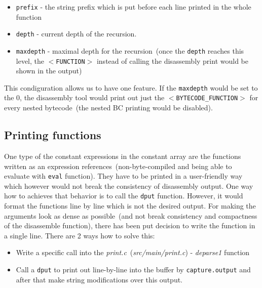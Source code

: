 \documentclass[thesis=M,english]{FITthesis}[2018/10/20]
\newcommand{\code}[1]{\texttt{#1}}
\begin{document}
\begin{itemize}
	\item \code{prefix} - the string prefix which is put before each line printed in the whole function

	\item \code{depth} - current depth of the recursion.

	\item \code{maxdepth} - maximal depth for the recursion~(once the \code{depth} reaches this level, the \code{$<$FUNCTION$>$} instead of calling the disassembly print would be shown in the output)
\end{itemize}

This condiguration allows us to have one feature. If the \code{maxdepth} would be set to the 0, the disassembly tool would print out just the \code{$<$BYTECODE{\_}FUNCTION$>$} for every nested bytecode~(the nested BC printing would be disabled).


\subsection{Printing functions}


One type of the constant expressions in the constant array are the functions written as an expression references~(non-byte-compiled and being able to evaluate with \code{eval} function). They have to be printed in a user-friendly way which however would not break the consistency of disassembly output. One way how to achieves that behavior is to call the \code{dput} function. However, it would format the functions line by line which is not the desired output. For making the arguments look as dense as possible~(and not break consistency and compactness of the disassemble function), there has been put decision to write the function in a single line. There are 2 ways how to solve this:

\begin{itemize}
	\item Write a specific call into the \textit{print.c}~(\textit{src/main/print.c}) - \textit{deparse1} function
	\item Call a \code{dput} to print out line-by-line into the buffer by \code{capture.output} and after that make string modifications over this output.
\end{itemize}
\end{document}
